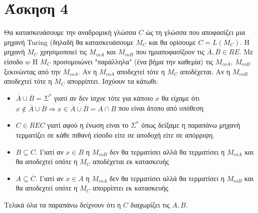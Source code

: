 \documentclass[11pt]{article}
\begin{document}



\section*{Άσκηση 4}
Θα κατασκευάσουμε την αναδρομική γλώσσα $C$ ώς τη γλώσσα που αποφασίζει μια μηχανή Turing 
(δηλαδή θα κατασκευάσουμε $M_C$ και θα ορίσουμε $C=L(M_C)$. Η μηχανή $M_C$
χρησιμοποιεί τις $M_{coA}$ και $M_{coB}$ που ημιαποφασίζουν τις $\overline{A},\overline{B}\in RE$.
Με είσοδο $w$ H $M_C$ προσομοιώνει "παράλληλα" (ένα βήμα την καθεμία) τις $M_{coA}$, $M_{coB}$
ξεκινώντας από την $M_{coA}$. Αν η $M_{coA}$ αποδεχτεί τότε η $M_C$ αποδέχεται. Αν η $M_{coB}$ αποδεχτεί
τότε η $M_C$ απορρίπτει. Ισχύουν τα κάτωθι:
\begin{itemize}
  \item  $\overline{A}\cup \overline{B} = \Sigma^*$ γιατί αν δεν ίσχυε τότε για κάποιο $x$ θα είχαμε ότι
    $x\notin\overline{A}\cup \overline{B} \Rightarrow x\in\overline{\overline{A}\cup \overline{B}}=A\cap B$
    που είναι άτοπο από υπόθεση
  \item $C\in REC$ γιατί αφού η ένωση είναι το $\Sigma^*$ όπως δείξαμε η παραπάνω μηχανή τερματίζει σε 
    κάθε πιθανή είσοδο είτε σε αποδοχή είτε σε απόρριψη.
  \item $B\subseteq C$. Γιατί αν $x\in B$ η $M_{coB}$ δεν θα τερματίσει αλλά θα τερματίσει η  
    $M_{coA}$ και θα αποδεχτεί οπότε η $M_C$ αποδέχεται εκ κατασκευής
  \item $A\subseteq \overline{C}$. Γιατί αν $x\in A$ η $M_{coA}$ δεν θα τερματίσει αλλά θα τερματίσει η  
    $M_{coB}$ και θα αποδεχτεί οπότε η $M_C$ απορρίπτει εκ κατασκευής
\end{itemize}
Τελικά όλα τα παραπάνω δείχνουν ότι η $C$ διαχωρίζει τις $A,B$.


\end{document}
